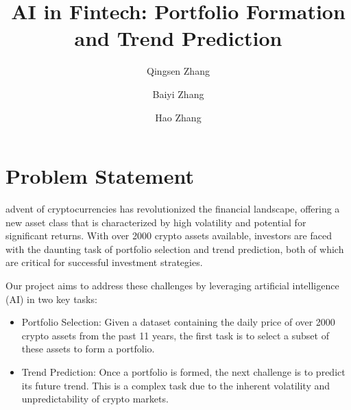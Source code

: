 \documentclass[journal]{IEEEtran}
\begin{document}
\title{{\Large \textbf{AI in Fintech: Portfolio Formation and Trend Prediction}}}

\author[1]{Qingsen Zhang}
\author[1]{Baiyi Zhang}
\author[1]{Hao Zhang}


\maketitle



\section{Problem Statement}
 advent of cryptocurrencies has revolutionized the financial landscape, offering a new asset class that is characterized by high volatility and potential for significant returns. With over 2000 crypto assets available, investors are faced with the daunting task of portfolio selection and trend prediction, both of which are critical for successful investment strategies.

Our project aims to address these challenges by leveraging artificial intelligence (AI) in two key tasks:
\begin{itemize}
  \item Portfolio Selection: Given a dataset containing the daily price of over 2000 crypto assets from the past 11 years, the first task is to select a subset of these assets to form a portfolio. 
  \item Trend Prediction: Once a portfolio is formed, the next challenge is to predict its future trend. This is a complex task due to the inherent volatility and unpredictability of crypto markets.
\end{itemize}
\end{document}
